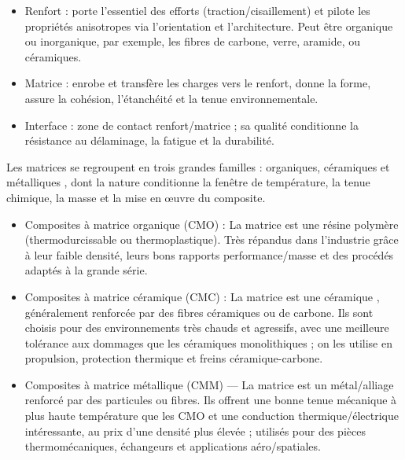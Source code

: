 \documentclass[a4paper,11pt]{article}
\begin{document}
\begin{itemize}
    \item Renfort : porte l'essentiel des efforts (traction/cisaillement) et pilote les propriétés anisotropes via l'orientation et l'architecture. Peut être organique ou inorganique, par exemple, les fibres de carbone, verre, aramide, ou céramiques.
    \item Matrice : enrobe et transfère les charges vers le renfort, donne la forme, assure la cohésion, l'étanchéité et la tenue environnementale.
    \item Interface : zone de contact renfort/matrice ; sa qualité conditionne la résistance au délaminage, la fatigue et la durabilité.
\end{itemize}

\vspace{0.2cm}
Les matrices se regroupent en trois grandes familles : organiques, céramiques et métalliques \cite{Gornet2008}, dont la nature conditionne la fenêtre de température, la tenue chimique, la masse et la mise en œuvre du composite.

\begin{itemize}
    \item Composites à matrice organique (CMO) : La matrice est une résine polymère (thermodurcissable  ou thermoplastique). Très répandus dans l'industrie grâce à leur faible densité, leurs bons rapports performance/masse et des procédés adaptés à la grande série.
    \item Composites à matrice céramique (CMC) : La matrice est une céramique , généralement renforcée par des fibres céramiques ou de carbone. Ils sont choisis pour des environnements très chauds et agressifs, avec une meilleure tolérance aux dommages que les céramiques monolithiques ; on les utilise en propulsion, protection thermique et freins céramique-carbone.
    \item Composites à matrice métallique (CMM) — La matrice est un métal/alliage renforcé par des particules ou fibres. Ils offrent une bonne tenue mécanique à plus haute température que les CMO et une conduction thermique/électrique intéressante, au prix d'une densité plus élevée ; utilisés pour des pièces thermomécaniques, échangeurs et applications aéro/spatiales.
\end{itemize}
\end{document}

